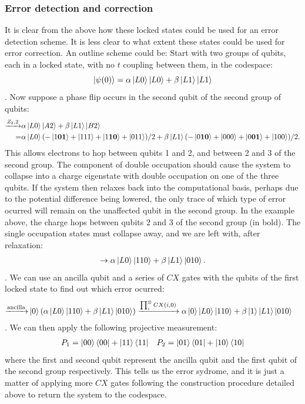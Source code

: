 \documentclass{report}
\begin{document}
\begin{appendices}
\subsubsection{Error detection and correction}
It is clear from the above how these locked states could be used for an error detection scheme. It is less clear to what extent these states could be used for error correction. An outline scheme could be:
Start with two groups of qubits, each in a locked state, with no $t$ coupling between them, in the codespace:
\begin{equation*}
    \ket{\psi(0)} = \alpha\ket{L0}\ket{L0} + \beta\ket{L1}\ket{L1}
\end{equation*}. Now suppose a phase flip occurs in the second qubit of the second group of qubits:
\begin{align*}
    \xrightarrow{Z_2,2} &\alpha\ket{L0}\ket{A2} + \beta\ket{L1}\ket{B2}\\
    =&\alpha\ket{L0}(-\ket{1\mathbf{01}} + \ket{111} + \ket{1\mathbf{10}}+\ket{011})/2 + \beta\ket{L1}(-\ket{0\mathbf{10}} + \ket{000} + \ket{0\mathbf{01}}+\ket{100})/2.
\end{align*}
This allows electrons to hop between qubits 1 and 2, and between 2 and 3 of the second group. The component of double occupation should cause the system to collapse into a charge eigenstate with double occupation on one of the three qubits. If the system then relaxes back into the computational basis, perhaps due to the potential difference being lowered, the only trace of which type of error ocurred will remain on the unaffected qubit in the second group. In the example above, the charge hops between qubits 2 and 3 of the second group (in bold). The single occupation states must collapse away, and we are left with, after relaxation:
\begin{align*}
    \rightarrow\alpha\ket{L0}\ket{110} + \beta\ket{L1}\ket{010}.
\end{align*}. We can use an ancilla qubit and a series of $CX$ gates with the qubits of the first locked state to find out which error ocurred:
\begin{align*}
    \xrightarrow{\text{ancilla}} & \ket{0}(\alpha\ket{L0}\ket{110} + \beta\ket{L1}\ket{010})
    \xrightarrow{\prod_i^\otimes CX(i,0)}\alpha\ket{0}\ket{L0}\ket{110} + \beta\ket{1}\ket{L1}\ket{010}
\end{align*}. We can then apply the following projective measurement:
\begin{align*}
    P_1 = \ket{00}\bra{00} + \ket{11}\bra{11} && P_2 = \ket{01}\bra{01} + \ket{10}\bra{10}
\end{align*}
where the first and second qubit represent the ancilla qubit and the first qubit of the second group respectively. This tells us the error sydrome, and it is just a matter of applying more $CX$ gates following the construction procedure detailed above to return the system to the codespace.
\end{appendices}

\printbibliography %
\end{document}
